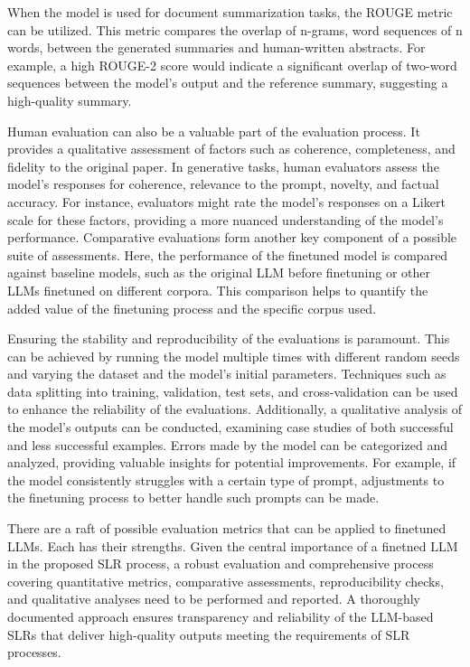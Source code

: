 \documentclass{article}
\begin{document}
When the model is used for document summarization tasks, the ROUGE metric can be utilized. This metric compares the overlap of n-grams, word sequences of n words, between the generated summaries and human-written abstracts. For example, a high ROUGE-2 score would indicate a significant overlap of two-word sequences between the model's output and the reference summary, suggesting a high-quality summary.

Human evaluation can also be a valuable part of the evaluation process. It provides a qualitative assessment of factors such as coherence, completeness, and fidelity to the original paper. In generative tasks, human evaluators assess the model's responses for coherence, relevance to the prompt, novelty, and factual accuracy. For instance, evaluators might rate the model's responses on a Likert scale for these factors, providing a more nuanced understanding of the model's performance. Comparative evaluations form another key component of a possible suite of assessments. Here, the performance of the finetuned model is compared against baseline models, such as the original LLM before finetuning or other LLMs finetuned on different corpora. This comparison helps to quantify the added value of the finetuning process and the specific corpus used.

Ensuring the stability and reproducibility of the evaluations is paramount. This can be achieved by running the model multiple times with different random seeds and varying the dataset and the model's initial parameters. Techniques such as data splitting into training, validation, test sets, and cross-validation can be used to enhance the reliability of the evaluations. Additionally, a qualitative analysis of the model's outputs can be conducted, examining case studies of both successful and less successful examples. Errors made by the model  can be categorized and analyzed, providing valuable insights for potential improvements. For example, if the model consistently struggles with a certain type of prompt, adjustments to the finetuning process to better handle such prompts can be made.

There are a raft of possible evaluation metrics that can be applied to finetuned LLMs. Each has their strengths. Given the central importance of a finetned LLM in the proposed SLR process, a robust evaluation and comprehensive process covering quantitative metrics, comparative assessments, reproducibility checks, and qualitative analyses need to be performed and reported. A thoroughly documented approach ensures transparency and reliability of the LLM-based SLRs that deliver high-quality outputs meeting the requirements of SLR processes.
\end{document}
